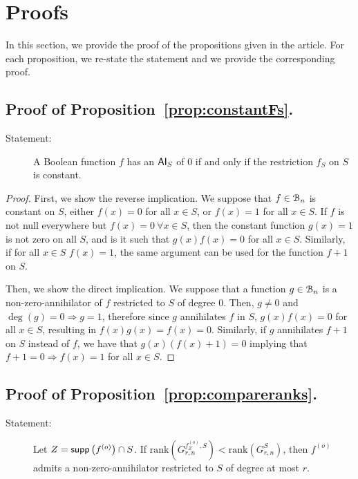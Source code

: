 \documentclass[11pt]{llncs}
\begin{document}
\appendix
\setcounter{algorithm}{1}
\section{Proofs}\label{sec:proofs}
In this section, we provide the proof of the propositions given in the article. 
For each proposition, we re-state the statement and we provide the corresponding proof.
\subsection{Proof of Proposition~\ref{prop:constantFs}.}
\begin{description}
    \item[Statement:] A Boolean function $f$ has an $\mathsf{AI}_S$ of $0$ if and only if the restriction $f_S$ on $S$ is constant.
\end{description}

\begin{proof}
	First, we show the reverse implication.
	We suppose that $f\in \mathcal{B}_n$ is constant on $S$, either $f(x) = 0$ for all $x\in S$, or $f(x) = 1$ for all $x\in S$.
	If $f$ is not null everywhere but $f(x) = 0\ \forall x \in  S$, then the constant function $g(x) = 1$ is not zero on all $S$, and is it such that $g(x)f(x) = 0$ for all $x\in S$. 
	Similarly, if for all $x\in S$ $f(x) = 1$, the same argument can be used for the function $f+ 1$ on $S$.
	
	Then, we show the direct implication.
	We suppose that a function $g\in \mathcal{B}_n$ is a non-zero-annihilator of $f$ restricted to $S$ of degree $0$. Then,
	$g \neq 0$ and $\deg(g) = 0 \Rightarrow g = 1$, therefore since $g$ annihilates $f$ in $S$,  $g(x) f(x) = 0$ for all $x \in S$, resulting in $f(x)g(x) = f(x) = 0$.
	Similarly, if $g$ annihilates $f+ 1$ on $S$ instead of $f$, we have that $g(x)(f(x) + 1) = 0$ implying that $f+ 1 = 0 \Rightarrow f(x) = 1$ for all $x\in S$. 
\end{proof}

\subsection{Proof of Proposition~\ref{prop:compareranks}.}
\begin{description}
    \item[Statement:] Let $Z = \mathsf{supp}\left(f^{(o)}\right) \cap S$.
If $\text{rank}\left(G^{f_{Z}^{(o)},S}_{r,n}\right) < \text{rank}(G^{S}_{r,n})$, then $f^{(o)}$ admits a non-zero-annihilator restricted to $S$ of degree at most $r$.
\end{description}
\end{document}
